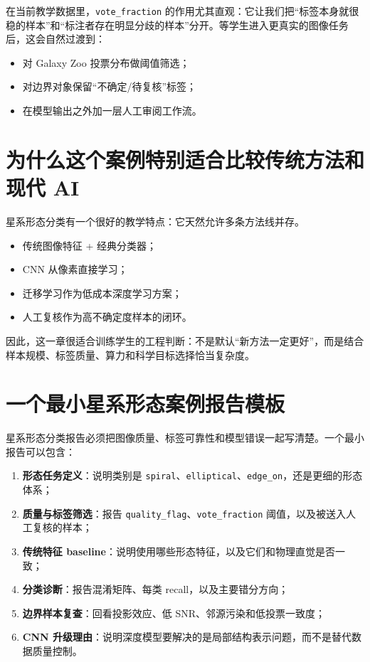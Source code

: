 在当前教学数据里，\texttt{vote\_fraction} 的作用尤其直观：它让我们把“标签本身就很稳的样本”和“标注者存在明显分歧的样本”分开。等学生进入更真实的图像任务后，这会自然过渡到：

\begin{itemize}
    \item 对 Galaxy Zoo 投票分布做阈值筛选；
    \item 对边界对象保留“不确定/待复核”标签；
    \item 在模型输出之外加一层人工审阅工作流。
\end{itemize}

\section{为什么这个案例特别适合比较传统方法和现代 AI}

星系形态分类有一个很好的教学特点：它天然允许多条方法线并存。

\begin{itemize}
    \item 传统图像特征 + 经典分类器；
    \item CNN 从像素直接学习；
    \item 迁移学习作为低成本深度学习方案；
    \item 人工复核作为高不确定度样本的闭环。
\end{itemize}

因此，这一章很适合训练学生的工程判断：不是默认“新方法一定更好”，而是结合样本规模、标签质量、算力和科学目标选择恰当复杂度。

\section{一个最小星系形态案例报告模板}

星系形态分类报告必须把图像质量、标签可靠性和模型错误一起写清楚。一个最小报告可以包含：

\begin{enumerate}
    \item \textbf{形态任务定义}：说明类别是 \texttt{spiral}、\texttt{elliptical}、\texttt{edge\_on}，还是更细的形态体系；
    \item \textbf{质量与标签筛选}：报告 \texttt{quality\_flag}、\texttt{vote\_fraction} 阈值，以及被送入人工复核的样本；
    \item \textbf{传统特征 baseline}：说明使用哪些形态特征，以及它们和物理直觉是否一致；
    \item \textbf{分类诊断}：报告混淆矩阵、每类 recall，以及主要错分方向；
    \item \textbf{边界样本复查}：回看投影效应、低 SNR、邻源污染和低投票一致度；
    \item \textbf{CNN 升级理由}：说明深度模型要解决的是局部结构表示问题，而不是替代数据质量控制。
\end{enumerate}

